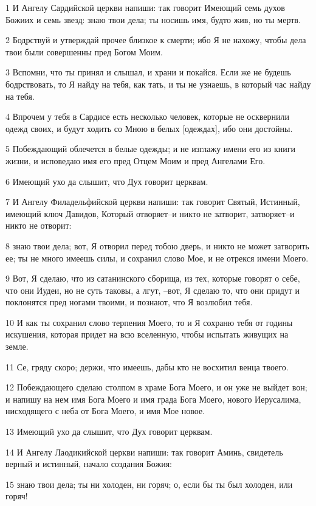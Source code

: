 \par 1 И Ангелу Сардийской церкви напиши: так говорит Имеющий семь духов Божиих и семь звезд: знаю твои дела; ты носишь имя, будто жив, но ты мертв.
\par 2 Бодрствуй и утверждай прочее близкое к смерти; ибо Я не нахожу, чтобы дела твои были совершенны пред Богом Моим.
\par 3 Вспомни, что ты принял и слышал, и храни и покайся. Если же не будешь бодрствовать, то Я найду на тебя, как тать, и ты не узнаешь, в который час найду на тебя.
\par 4 Впрочем у тебя в Сардисе есть несколько человек, которые не осквернили одежд своих, и будут ходить со Мною в белых [одеждах], ибо они достойны.
\par 5 Побеждающий облечется в белые одежды; и не изглажу имени его из книги жизни, и исповедаю имя его пред Отцем Моим и пред Ангелами Его.
\par 6 Имеющий ухо да слышит, что Дух говорит церквам.
\par 7 И Ангелу Филадельфийской церкви напиши: так говорит Святый, Истинный, имеющий ключ Давидов, Который отворяет--и никто не затворит, затворяет--и никто не отворит:
\par 8 знаю твои дела; вот, Я отворил перед тобою дверь, и никто не может затворить ее; ты не много имеешь силы, и сохранил слово Мое, и не отрекся имени Моего.
\par 9 Вот, Я сделаю, что из сатанинского сборища, из тех, которые говорят о себе, что они Иудеи, но не суть таковы, а лгут, --вот, Я сделаю то, что они придут и поклонятся пред ногами твоими, и познают, что Я возлюбил тебя.
\par 10 И как ты сохранил слово терпения Моего, то и Я сохраню тебя от годины искушения, которая придет на всю вселенную, чтобы испытать живущих на земле.
\par 11 Се, гряду скоро; держи, что имеешь, дабы кто не восхитил венца твоего.
\par 12 Побеждающего сделаю столпом в храме Бога Моего, и он уже не выйдет вон; и напишу на нем имя Бога Моего и имя града Бога Моего, нового Иерусалима, нисходящего с неба от Бога Моего, и имя Мое новое.
\par 13 Имеющий ухо да слышит, что Дух говорит церквам.
\par 14 И Ангелу Лаодикийской церкви напиши: так говорит Аминь, свидетель верный и истинный, начало создания Божия:
\par 15 знаю твои дела; ты ни холоден, ни горяч; о, если бы ты был холоден, или горяч!
